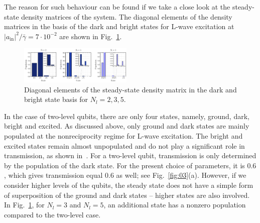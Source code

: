 \documentclass[lettersize,journal]{IEEEtran}
\begin{document}
The reason for such behaviour can be found if we take a close look at the steady-state density matrices of the system.
The diagonal elements of the density matrices in the basis of the dark and bright states for L-wave excitation at $|a_\mathrm{in}|^2 / \bar{\gamma} = 7 \cdot 10^{-2}$ are shown in Fig.~\ref{fig:04}.
\begin{figure}[h!]
    \centering
    \includegraphics[width=0.48\textwidth]{fig_7}
    \caption{Diagonal elements of the steady-state density matrix in the dark and bright state basis for $N_l = 2, 3, 5$.}
    \label{fig:04}
\end{figure}
In the case of two-level qubits, there are only four states, namely, ground, dark, bright and excited.
As discussed above, only ground and dark states are mainly populated at the nonreciprocity regime for L-wave excitation.
The bright and excited states remain almost unpopulated and do not play a significant role in transmission, as shown in~\cite{muller_nonreciprocal_2017}.
For a two-level qubit, transmission is only determined by the population of the dark state. 
For the present choice of parameters, it is $0.6$, which gives transmission equal $0.6$ as well; see Fig.~\ref{fig:03}(a).
However, if we consider higher levels of the qubits, the steady state does not have a simple form of superposition of the ground and dark states -- higher states are also involved.
In Fig.~\ref{fig:04}, for $N_l = 3$ and $N_l = 5$, an additional state has a nonzero population compared to the two-level case.
\end{document}
